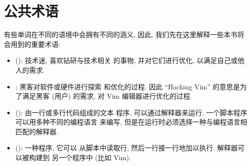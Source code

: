 \section{公共术语}
\label{sec:common_terminology}

有些单词在不同的语境中会拥有不同的涵义, 因此, 我们先在这里解释一些本书将
会用到的重要术语:
\begin{itemize}
    \item {} (): 技术迷, 喜欢钻研与技术相关
        的事物, 并对它们进行优化, 以满足自己或他人的需求.
    \item {}: 黑客对软件或硬件进行探索
        和优化的过程. 因此 ``Hacking Vim'' 的意思是为了满足黑客 (用户)
        的需求, 对 Vim 编辑器进行优化的过程.
    \item {} (): 由一行或多行代码组成的文本
        程序, 可以通过解释器来运行. 一个脚本程序可以用多种不同的编程语言
        来编写, 但是在运行时必须选择一种与编程语言相匹配的解释器.
    \item {} (): 一种程序, 它可以
        从脚本中读取行, 然后一行接一行地加以执行. 解释器可以被构建到
        另一个程序中 (比如 Vim).
\end{itemize}
